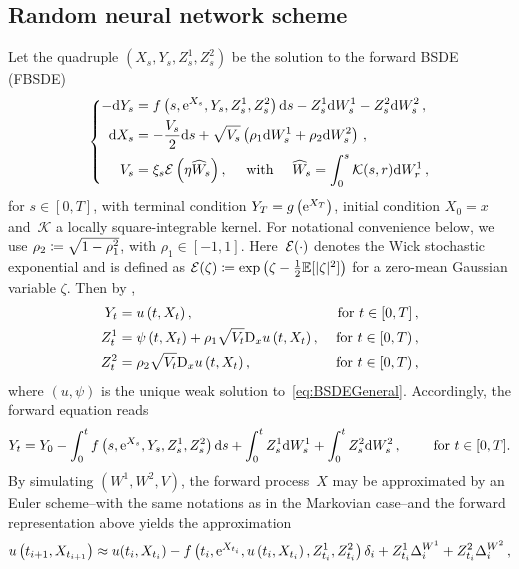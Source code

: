 \subsection{Random neural network scheme}
Let the quadruple $\left(X_{s}, Y_{s}, Z^1_{s}, Z^2_{s}\right)$ be the solution to the forward BSDE (FBSDE)
\begin{equation}\label{eq:logprocess}
\left\{\begin{aligned}
-\mathrm{d} Y_{s} &=f\left(s, \mathrm{e}^{X_{s}}, Y_{s}, Z^1_{s}, Z^2_{s}\right) \mathrm{d} s- Z^1_{s} \mathrm{d} W^1_{s}-Z^2_{s} \mathrm{d} W^2_{s}\,,\\
\mathrm{d} X_{s} &=-\frac{V_{s}}{2} \mathrm{d} s+\sqrt{V_{s}}\left(\rho_1 \mathrm{d} W^1_{s} + \rho_2\mathrm{d} W^2_{s}\right)\,,\\
V_{s} &= \xi_{s} \mathcal{E}\left(\eta \widehat{W}_{s}\right), \quad \text { with } \quad \widehat{W}_{s}=\int_{0}^{s} \mathcal{K}(s, r) \mathrm{d} W^1_{r}\,,
\end{aligned}\right.
\end{equation}
for $s \in[0, T]$, with terminal condition
$Y_{T} = g\left(\mathrm{e}^{X_{T}}\right)$, initial condition
$X_{0} = x$ and~$\mathcal{K}$ a locally square-integrable kernel. 
For notational convenience below, 
we use $\rho_2 \coloneqq  \sqrt{1-\rho_1^2}$, with 
$\rho_1 \in [-1,1]$.
Here~$\mathcal{E}(\cdot)$ denotes the Wick stochastic exponential and is defined as $\mathcal{E}(\zeta)\coloneqq \exp\left(\zeta-\frac12\mathbb{E}[|\zeta|^2]\right)$ for a zero-mean Gaussian variable $\zeta$. 
Then by \cite[Theorem~2.4]{Bayer2022PricingSPDEs},
\begin{align}
Y_{t} &= u\left(t, X_{t}\right),  & \text{ for } t\in[0,T]\,, \\
Z^1_{t} &= \psi\left(t, X_{t}\right) + 
\rho_1 \sqrt{V_{t}} \mathrm{D}_{x} u\left(t, X_{t}\right), & \textup{ for } t\in[0,T)\,, \\
Z^2_{t} &= \rho_2\sqrt{V_{t}} \mathrm{D}_{x} u\left(t, X_{t}\right), & \textup{ for } t\in[0,T)\,,
\end{align}
where $(u, \psi)$ is the unique weak solution to~\eqref{eq:BSDEGeneral}. Accordingly, the forward equation reads
\begin{equation*}
Y_t = Y_0-\int_{0}^{t} f\left(s, \mathrm{e}^{X_{s}}, Y_s, Z_s^1, Z_s^2\right) \mathrm{d} s +\int_{0}^{t}Z_s^1 \mathrm{d} W^1_{s}+\int_{0}^{t} Z_s^2 \mathrm{d} W^2_{s}\,,
\qquad\text{ for }t \in[0, T].
\end{equation*}
By simulating $(W^1, W^2, V)$, 
the forward process~$X$ may be approximated by an Euler scheme--with the same notations as in the Markovian case--and the forward representation above yields the approximation
$$
u\left(t_{i+1}, X_{t_{i+1}}\right) \approx u(t_{i}, X_{t_i}) - f\left(t_i, \mathrm{e}^{X_{t_{i}}}, u\left({t_{i}}, X_{t_{i}}\right), Z^1_{t_i}, Z^2_{t_i}\right) \delta_{i}  + Z^1_{t_i} \Delta^{W^1}_{i} + Z^2_{t_i} \Delta^{W^2}_{i}\,,
$$
